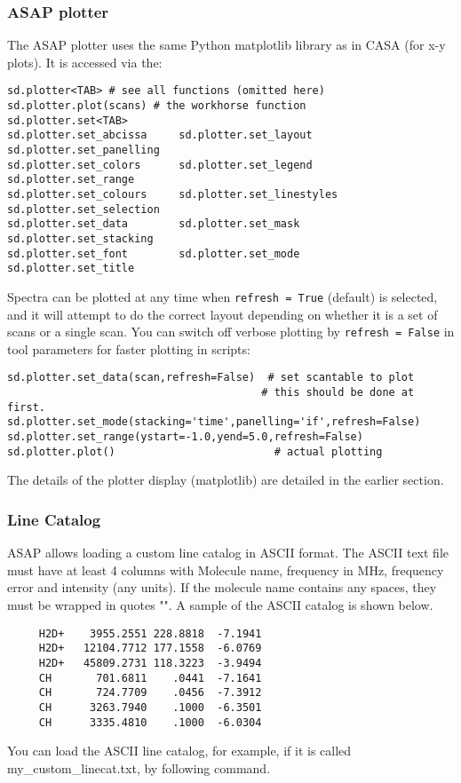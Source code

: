 \subsubsection{ASAP plotter}
The ASAP plotter uses the same Python matplotlib library as in CASA
(for x-y plots). It is accessed via the: 

\small
\begin{verbatim}
sd.plotter<TAB> # see all functions (omitted here)
sd.plotter.plot(scans) # the workhorse function
sd.plotter.set<TAB>
sd.plotter.set_abcissa     sd.plotter.set_layout      sd.plotter.set_panelling
sd.plotter.set_colors      sd.plotter.set_legend      sd.plotter.set_range
sd.plotter.set_colours     sd.plotter.set_linestyles  sd.plotter.set_selection
sd.plotter.set_data        sd.plotter.set_mask        sd.plotter.set_stacking
sd.plotter.set_font        sd.plotter.set_mode        sd.plotter.set_title
\end{verbatim}
\normalsize

Spectra can be plotted at any time when {\tt refresh = True} (default) is
selected, and it will attempt to do the correct layout depending on
whether it is a set of scans or a single scan. 
You can switch off verbose plotting by {\tt refresh = False} in
tool parameters for faster plotting in scripts: 


\begin{verbatim}
sd.plotter.set_data(scan,refresh=False)  # set scantable to plot
                                        # this should be done at first.
sd.plotter.set_mode(stacking='time',panelling='if',refresh=False)
sd.plotter.set_range(ystart=-1.0,yend=5.0,refresh=False)
sd.plotter.plot()                         # actual plotting
\end{verbatim}

The details of the plotter display (matplotlib) are detailed in
the earlier section.

\subsubsection{Line Catalog}
ASAP allows loading a custom line catalog in ASCII format.
The ASCII text file must have at least 4 columns with Molecule name, 
frequency in MHz, frequency error and intensity (any units).
If the molecule name contains any spaces, they must be wrapped in quotes "".
A sample of the ASCII catalog is shown below.

\small
\begin{verbatim}
     H2D+    3955.2551 228.8818  -7.1941  
     H2D+   12104.7712 177.1558  -6.0769  
     H2D+   45809.2731 118.3223  -3.9494  
     CH       701.6811    .0441  -7.1641  
     CH       724.7709    .0456  -7.3912  
     CH      3263.7940    .1000  -6.3501  
     CH      3335.4810    .1000  -6.0304
\end{verbatim}
\normalsize
You can load the ASCII line catalog, for example, if
it is called my\_custom\_linecat.txt,
by following command.

